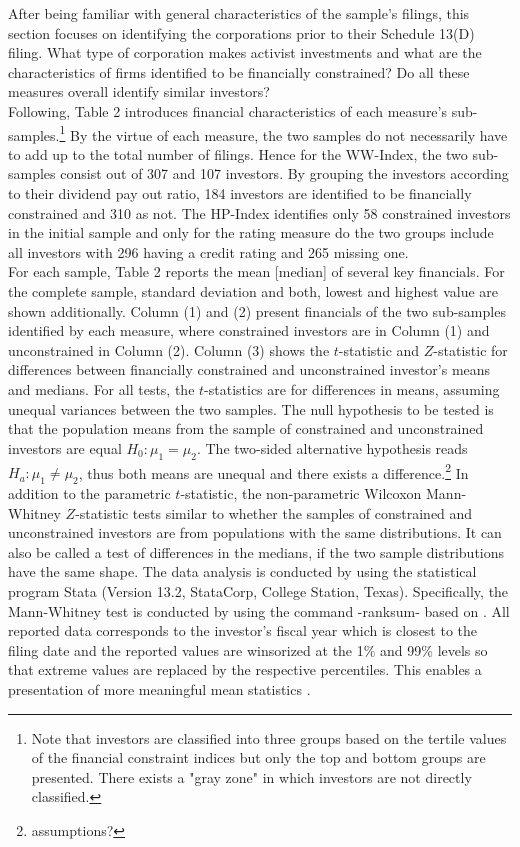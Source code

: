 \documentclass[12pt]{article}
\begin{document}
After being familiar with general characteristics of the sample's filings, this section focuses on identifying the corporations prior to their Schedule 13(D) filing. What type of corporation makes activist investments and what are the characteristics of firms identified to be financially constrained? Do all these measures overall identify similar investors?\\
Following, Table 2 introduces financial characteristics of each measure's sub-samples.\footnote{Note that investors are classified into three groups based on the tertile values of the financial constraint indices but only the top and bottom groups are presented. There exists a "gray zone" in which investors are not directly classified.} By the virtue of each measure, the two samples do not necessarily have to add up to the total number of filings. Hence for the WW-Index, the two sub-samples consist out of 307 and 107 investors. By grouping the investors according to their dividend pay out ratio, 184 investors are identified to be financially constrained and 310 as not. The HP-Index identifies only 58 constrained investors in the initial sample and only for the rating measure do the two groups include all investors with 296 having a credit rating and 265 missing one.\\
For each sample, Table 2 reports the mean [median] of several key financials. For the complete sample, standard deviation and both, lowest and highest value are shown additionally. Column (1) and (2) present financials of the two sub-samples identified by each measure, where constrained investors are in Column (1) and unconstrained in Column (2). Column (3) shows the $t$-statistic and $Z$-statistic for differences between financially constrained and unconstrained investor's means and medians. For all tests, the $t$-statistics are for differences in means, assuming unequal variances between the two samples. The null hypothesis to be tested is that the population means from the sample of constrained and unconstrained investors are equal $H_{0}: \mu_{1}=\mu_{2}$. The two-sided alternative hypothesis reads $H_{a}: \mu_{1}\neq\mu_{2}$, thus both means are unequal and there exists a difference.\footnote{assumptions?} In addition to the parametric $t$-statistic, the non-parametric Wilcoxon Mann-Whitney $Z$-statistic tests similar to \citet[p.201]{Klein2009} whether the samples of constrained and unconstrained investors are from populations with the same distributions. It can also be called a test of differences in the medians, if the two sample distributions have the same shape. The data analysis is conducted by using the statistical program Stata (Version 13.2, StataCorp, College Station, Texas). Specifically, the Mann-Whitney test is conducted by using the command -ranksum- based on \citet[p.59]{Mann1947}. All reported data corresponds to the investor's fiscal year which is closest to the filing date and the reported values are winsorized at the 1\% and 99\% levels so that extreme values are replaced by the respective percentiles. This enables a presentation of more meaningful mean statistics \citep[p.203]{Klein2009}. 
\pagebreak
\end{document}
